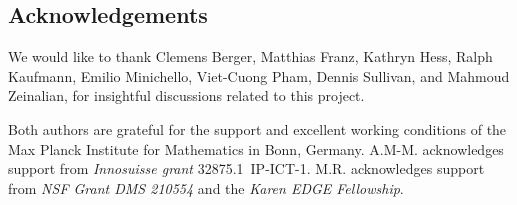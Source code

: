 
\subsection*{Acknowledgements}

We would like to thank Clemens Berger, Matthias Franz, Kathryn Hess, Ralph Kaufmann, Emilio Minichello, Viet-Cuong Pham, Dennis Sullivan, and Mahmoud Zeinalian, for insightful discussions related to this project.

Both authors are grateful for the support and excellent working conditions of the Max Planck Institute for Mathematics in Bonn, Germany.
A.M-M. acknowledges support from \textit{Innosuisse grant} \mbox{32875.1 IP-ICT-1}.
M.R. acknowledges support from \textit{NSF Grant DMS 210554} and the \textit{Karen EDGE Fellowship}.